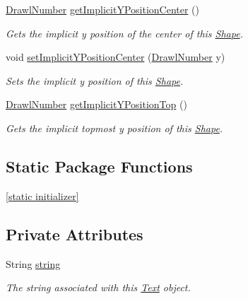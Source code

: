 \begin{DoxyCompactItemize}
\hyperlink{classcom_1_1aarrelaakso_1_1drawl_1_1_drawl_number}{Drawl\+Number} \hyperlink{classcom_1_1aarrelaakso_1_1drawl_1_1_shape_a0549739ee3201ae16091acce4ee6a5ac}{get\+Implicit\+Y\+Position\+Center} ()
\begin{DoxyCompactList}\small\item\em Gets the implicit y position of the center of this \hyperlink{classcom_1_1aarrelaakso_1_1drawl_1_1_shape}{Shape}. \end{DoxyCompactList}\item 
void \hyperlink{classcom_1_1aarrelaakso_1_1drawl_1_1_shape_ac49fa20747ea798a3b56c3ea99df2d8f}{set\+Implicit\+Y\+Position\+Center} (\hyperlink{classcom_1_1aarrelaakso_1_1drawl_1_1_drawl_number}{Drawl\+Number} y)
\begin{DoxyCompactList}\small\item\em Sets the implicit y position of this \hyperlink{classcom_1_1aarrelaakso_1_1drawl_1_1_shape}{Shape}. \end{DoxyCompactList}\item 
\hyperlink{classcom_1_1aarrelaakso_1_1drawl_1_1_drawl_number}{Drawl\+Number} \hyperlink{classcom_1_1aarrelaakso_1_1drawl_1_1_shape_afb64d51ac2023ad770bbc8f37061d5b0}{get\+Implicit\+Y\+Position\+Top} ()
\begin{DoxyCompactList}\small\item\em Gets the implicit topmost y position of this \hyperlink{classcom_1_1aarrelaakso_1_1drawl_1_1_shape}{Shape}. \end{DoxyCompactList}\end{DoxyCompactItemize}
\subsection*{Static Package Functions}
\begin{DoxyCompactItemize}
\item 
\hyperlink{classcom_1_1aarrelaakso_1_1drawl_1_1_shape_ad2adcb85374cf5d6d59429628314e8d1}{\mbox{[}static initializer\mbox{]}}
\end{DoxyCompactItemize}
\subsection*{Private Attributes}
\begin{DoxyCompactItemize}
\item 
String \hyperlink{classcom_1_1aarrelaakso_1_1drawl_1_1_text_a94bf15b06c72349f5d5a1bfc56496685}{string}
\begin{DoxyCompactList}\small\item\em The string associated with this \hyperlink{classcom_1_1aarrelaakso_1_1drawl_1_1_text}{Text} object. \end{DoxyCompactList}\end{DoxyCompactItemize}


